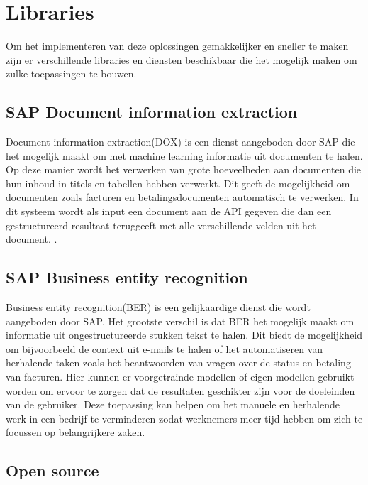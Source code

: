 

\section{Libraries}
\label{sec:libraries}

Om het implementeren van deze oplossingen gemakkelijker en sneller te maken zijn er verschillende libraries en diensten beschikbaar die het mogelijk maken om zulke toepassingen te bouwen.

\subsection{SAP Document information extraction}

Document information extraction(DOX) is een dienst aangeboden door SAP die het mogelijk maakt om met machine learning informatie uit documenten te halen. Op deze manier wordt het verwerken van grote hoeveelheden aan documenten die hun inhoud in titels en tabellen hebben verwerkt. Dit geeft de mogelijkheid om documenten zoals facturen en betalingsdocumenten automatisch te verwerken. In dit systeem wordt als input een document aan de API gegeven die dan een gestructureerd resultaat teruggeeft met alle verschillende velden uit het document. \autocite{SAPDOX}.

\subsection{SAP Business entity recognition}

Business entity recognition(BER) is een gelijkaardige dienst die wordt aangeboden door SAP. Het grootste verschil is dat BER het mogelijk maakt om informatie uit ongestructureerde stukken tekst te halen. Dit biedt de mogelijkheid om bijvoorbeeld de context uit e-mails te halen of het automatiseren van herhalende taken zoals het beantwoorden van vragen over de status en betaling van facturen. Hier kunnen er voorgetrainde modellen of eigen modellen gebruikt worden om ervoor te zorgen dat de resultaten geschikter zijn voor de doeleinden van de gebruiker. Deze toepassing kan helpen om het manuele en herhalende werk in een bedrijf te verminderen zodat werknemers meer tijd hebben om zich te focussen op belangrijkere zaken.

\subsection{Open source}

